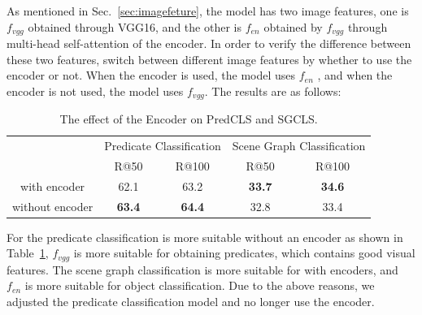 As mentioned in Sec.~\ref{sec:imagefeture}, the model has two image features, one is $  f_{vgg} $ obtained through VGG16, and the other is $ f_{en} $ obtained by $  f_{vgg} $ through multi-head self-attention of the encoder. In order to verify the difference between these two features, switch between different image features by whether to use the encoder or not. When the encoder is used, the model uses $ f_{en} $ , and when the encoder is not used, the model uses $  f_{vgg} $. The results are as follows:

\begin{table}[]
	\centering
	\begin{tabular}{c|cccc}
		\hline
		\multirow{2}{*}{} & \multicolumn{2}{c|}{Predicate Classification} & \multicolumn{2}{c}{Scene Graph Classification} \\ \cline{2-5} 
		& R@50            & \multicolumn{1}{c|}{R@100}  & R@50                   & R@100                 \\ \hline
		with encoder      & 62.1            & 63.2                        & \textbf{33.7}          & \textbf{34.6}         \\
		without encoder   & \textbf{63.4}   & \textbf{64.4}               & 32.8                   & 33.4            \\ \hline     
	\end{tabular}
	\caption[The effect of encoder on PredCLS and SGCLS]{The effect of the Encoder on PredCLS and SGCLS.} 
	\label{tab:encoder}
\end{table}%

For the predicate classification is more suitable without an encoder as shown in Table~\ref{tab:encoder}, $  f_{vgg} $  is more suitable for obtaining predicates, which contains good visual features. The scene graph classification is more suitable for with encoders, and $ f_{en} $ is more suitable for object classification. Due to the above reasons, we adjusted the predicate classification model and no longer use the encoder.


